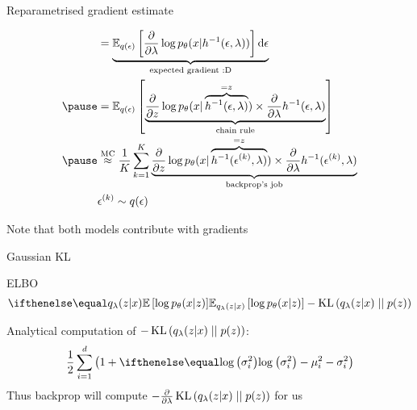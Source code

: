 \begin{frame}[plain]{Reparametrised gradient estimate}

\begin{equation*}
\begin{aligned}
&= \underbrace{\mathbb E_{q(\epsilon)}\left[ \pdv{\lambda} \log p_\theta(x| h^{-1}(\epsilon, \lambda))\right] \dd{\epsilon}}_{\text{expected gradient :D}} \\ \pause
&= \mathbb E_{q(\epsilon)} \left[ \underbrace{\pdv{z} \log p_\theta(x| \overbrace{h^{-1}(\epsilon, \lambda)}^{=z}) \times \pdv{\lambda} h^{-1}(\epsilon, \lambda)}_{\text{chain rule}} \right] \\ \pause
&\overset{\text{MC}}{\approx} \frac{1}{K}\sum_{k=1}^{K} \underbrace{\pdv{z} \log p_\theta(x| \overbrace{h^{-1}(\epsilon^{(k)}, \lambda)}^{=z}) \times \pdv{\lambda} h^{-1}(\epsilon^{(k)}, \lambda)}_{\text{backprop's job}}\\
&\epsilon^{(k)} \sim q(\epsilon)
\end{aligned}
\end{equation*}

Note that both models contribute with gradients

\end{frame}

\begin{frame}{Gaussian KL}
\begin{block}{ELBO}
\begin{equation*}
\E[q_\lambda(z|x)]{\log p_\theta(x|z)} - \KL{q_\lambda(z|x)}{p(z)}
\end{equation*}
\end{block}
\pause
Analytical computation of $ -\operatorname{KL}\left(q_\lambda(z|x)\mid\mid p(z)\right) $:
\begin{equation*}
\frac{1}{2}\sum_{i=1}^{d}\left(1 + \loga{\sigma^{2}_{i}} -
\mu^{2}_{i} - \sigma^{2}_{i} \right)
\end{equation*}
\pause
Thus backprop will compute $-\pdv{\lambda} \operatorname{KL}\left(q_\lambda(z|x)\mid\mid p(z)\right)$ for us
\end{frame}

